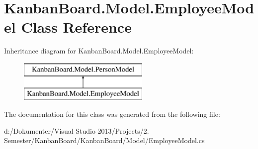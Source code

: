 \hypertarget{class_kanban_board_1_1_model_1_1_employee_model}{}\section{Kanban\+Board.\+Model.\+Employee\+Model Class Reference}
\label{class_kanban_board_1_1_model_1_1_employee_model}
Inheritance diagram for Kanban\+Board.\+Model.\+Employee\+Model\+:\begin{figure}[H]
\begin{center}
\leavevmode
\includegraphics[height=2.000000cm]{class_kanban_board_1_1_model_1_1_employee_model}
\end{center}
\end{figure}


The documentation for this class was generated from the following file\+:\begin{DoxyCompactItemize}
\item 
d\+:/\+Dokumenter/\+Visual Studio 2013/\+Projects/2. Semester/\+Kanban\+Board/\+Kanban\+Board/\+Model/Employee\+Model.\+cs\end{DoxyCompactItemize}
